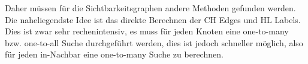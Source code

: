 Daher müssen für die Sichtbarkeitsgraphen andere Methoden gefunden werden.
Die naheliegendste Idee ist das direkte Berechnen der CH Edges und HL Labels.
Dies ist zwar sehr rechenintensiv, es muss für jeden Knoten eine one-to-many bzw. one-to-all Suche durchgeführt werden, dies ist jedoch schneller möglich, also für jeden in-Nachbar eine one-to-many Suche zu berechnen.



